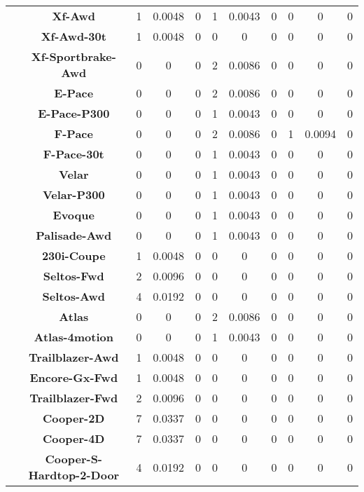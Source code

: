 \begin{center}
\begin{tabular}{|c|c||@{\hspace{1ex}}||c|c|c||@{\hspace{1ex}}||c|c|c||@{\hspace{1ex}}||c|c|c||@{\hspace{1ex}}||}
\cline{2-11}
  & {\bf Xf-Awd} & 1 & 0.0048 & 0 & 1 & 0.0043 & 0 & 0 & 0 & 0 \\
\cline{2-11}
  & {\bf Xf-Awd-30t} & 1 & 0.0048 & 0 & 0 & 0 & 0 & 0 & 0 & 0 \\
\cline{2-11}
  & {\bf Xf-Sportbrake-Awd} & 0 & 0 & 0 & 2 & 0.0086 & 0 & 0 & 0 & 0 \\
\cline{2-11}
  & {\bf E-Pace} & 0 & 0 & 0 & 2 & 0.0086 & 0 & 0 & 0 & 0 \\
\cline{2-11}
  & {\bf E-Pace-P300} & 0 & 0 & 0 & 1 & 0.0043 & 0 & 0 & 0 & 0 \\
\cline{2-11}
  & {\bf F-Pace} & 0 & 0 & 0 & 2 & 0.0086 & 0 & 1 & 0.0094 & 0 \\
\cline{2-11}
  & {\bf F-Pace-30t} & 0 & 0 & 0 & 1 & 0.0043 & 0 & 0 & 0 & 0 \\
\cline{2-11}
  & {\bf Velar} & 0 & 0 & 0 & 1 & 0.0043 & 0 & 0 & 0 & 0 \\
\cline{2-11}
  & {\bf Velar-P300} & 0 & 0 & 0 & 1 & 0.0043 & 0 & 0 & 0 & 0 \\
\cline{2-11}
  & {\bf Evoque} & 0 & 0 & 0 & 1 & 0.0043 & 0 & 0 & 0 & 0 \\
\cline{2-11}
  & {\bf Palisade-Awd} & 0 & 0 & 0 & 1 & 0.0043 & 0 & 0 & 0 & 0 \\
\cline{2-11}
  & {\bf 230i-Coupe} & 1 & 0.0048 & 0 & 0 & 0 & 0 & 0 & 0 & 0 \\
\cline{2-11}
  & {\bf Seltos-Fwd} & 2 & 0.0096 & 0 & 0 & 0 & 0 & 0 & 0 & 0 \\
\cline{2-11}
  & {\bf Seltos-Awd} & 4 & 0.0192 & 0 & 0 & 0 & 0 & 0 & 0 & 0 \\
\cline{2-11}
  & {\bf Atlas} & 0 & 0 & 0 & 2 & 0.0086 & 0 & 0 & 0 & 0 \\
\cline{2-11}
  & {\bf Atlas-4motion} & 0 & 0 & 0 & 1 & 0.0043 & 0 & 0 & 0 & 0 \\
\cline{2-11}
  & {\bf Trailblazer-Awd} & 1 & 0.0048 & 0 & 0 & 0 & 0 & 0 & 0 & 0 \\
\cline{2-11}
  & {\bf Encore-Gx-Fwd} & 1 & 0.0048 & 0 & 0 & 0 & 0 & 0 & 0 & 0 \\
\cline{2-11}
  & {\bf Trailblazer-Fwd} & 2 & 0.0096 & 0 & 0 & 0 & 0 & 0 & 0 & 0 \\
\cline{2-11}
  & {\bf Cooper-2D} & 7 & 0.0337 & 0 & 0 & 0 & 0 & 0 & 0 & 0 \\
\cline{2-11}
  & {\bf Cooper-4D} & 7 & 0.0337 & 0 & 0 & 0 & 0 & 0 & 0 & 0 \\
\cline{2-11}
  & {\bf Cooper-S-Hardtop-2-Door} & 4 & 0.0192 & 0 & 0 & 0 & 0 & 0 & 0 & 0 \\

\end{tabular}
\end{center}
